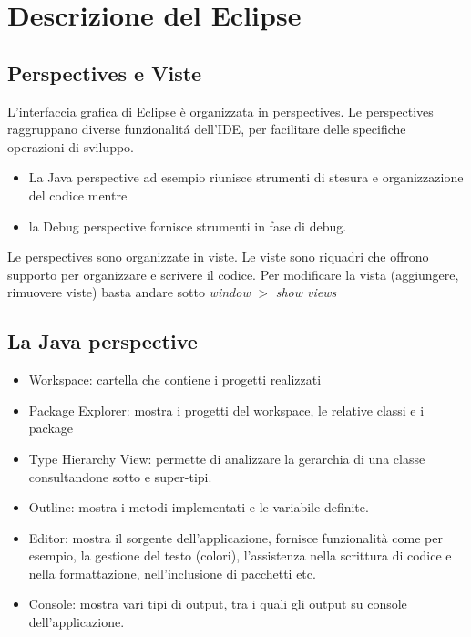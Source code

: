 \documentclass{article}
\begin{document}
\section{Descrizione del Eclipse}

\subsection{Perspectives e Viste}
L'interfaccia grafica di Eclipse \`e organizzata in perspectives. Le perspectives raggruppano diverse funzionalit\'a dell'IDE, per facilitare delle specifiche  operazioni di sviluppo. 
\begin{itemize}
\item La Java perspective ad esempio riunisce strumenti di stesura e organizzazione 
del codice mentre 
\item la Debug perspective fornisce strumenti in fase di debug.
\end{itemize}
Le perspectives sono organizzate in viste. Le viste sono riquadri che offrono supporto per organizzare e scrivere il codice. Per modificare la vista (aggiungere, rimuovere viste) basta andare sotto 
\textit{window} $>$ \textit{show views}


\subsection{La Java perspective}
\begin{itemize}
\item Workspace: cartella che contiene i progetti realizzati
\item Package Explorer: mostra i progetti del workspace, le relative classi e i package 
\item Type Hierarchy View: permette di analizzare la gerarchia di una classe consultandone sotto e super-tipi.
\item Outline: mostra i metodi  implementati e le variabile  definite.
\item Editor: mostra il sorgente dell'applicazione, fornisce funzionalit\` a come per esempio, la gestione del testo (colori), l'assistenza nella scrittura di codice e nella formattazione, nell'inclusione di pacchetti etc.
\item Console: mostra vari tipi di output, tra i quali gli output su console dell'applicazione.
\end{itemize}

\end{document}

